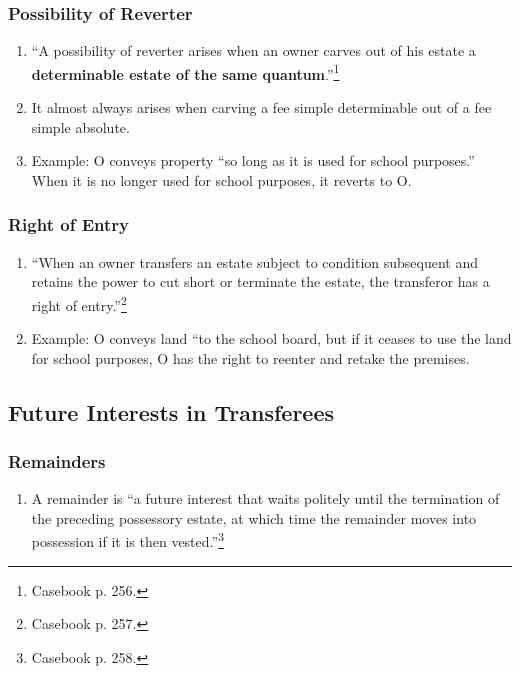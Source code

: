 \subsubsection{Possibility of Reverter}

\begin{enumerate}
    \item ``A possibility of reverter arises when an owner carves out of his 
    estate a \textbf{determinable estate of the same 
    quantum}.''\footnote{Casebook p. 256.}
    \item It almost always arises when carving a fee simple determinable out 
    of a fee simple absolute.
    \item Example: O conveys property ``so long as it is used for school 
    purposes.'' When it is no longer used for school purposes, it reverts to 
    O.
\end{enumerate}

\subsubsection{Right of Entry}

\begin{enumerate}
    \item ``When an owner transfers an estate subject to condition subsequent 
    and retains the power to cut short or terminate the estate, the transferor 
    has a right of entry.''\footnote{Casebook p. 257.}
    \item Example: O conveys land ``to the school board, but if it ceases to 
    use the land for school purposes, O has the right to reenter and retake 
    the premises.
\end{enumerate}

\subsection{Future Interests in Transferees}

\subsubsection{Remainders}

\begin{enumerate}
    \item A remainder is ``a future interest that waits politely until the 
    termination of the preceding possessory estate, at which time the 
    remainder moves into possession if it is then vested.''\footnote{Casebook 
    p. 258.}
\end{enumerate}

